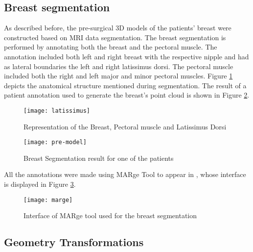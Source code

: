 \subsection{Breast segmentation}

As described before, the pre-surgical 3D models of the patients' breast were constructed based on MRI data segmentation. The breast segmentation is performed by annotating both the breast and the pectoral muscle. The annotation included both left and right breast with the respective nipple and had as lateral boundaries the left and right latissimus dorsi. The pectoral muscle included both the right and left major and minor pectoral muscles. Figure \ref{fig:latissimus} depicts the anatomical structure mentioned during segmentation. The result of a patient annotation used to generate the breast's point cloud is shown in Figure \ref{fig:pre_model_annotation}.

\begin{figure}[!htb]
\begin{center}
    \leavevmode
    \texttt{[image: latissimus]}
    \caption[Representation of the Breast, Pectoral muscle and Latissimus Dorsi]{Representation of the Breast, Pectoral muscle and Latissimus Dorsi}
    \label{fig:latissimus}
  \end{center}
\end{figure}

\begin{figure}[!htb]
\begin{center}
    \leavevmode
    \texttt{[image: pre-model]}
    \caption[Breast Segmentation result]{Breast Segmentation result for one of the patients}
    \label{fig:pre_model_annotation}
  \end{center}
\end{figure}

All the annotations were made using MARge Tool to appear in \cite{marge}, whose interface is displayed in Figure \ref{fig:marge}.

\begin{figure}[!h]
\begin{center}
    \leavevmode
    \texttt{[image: marge]}
    \caption[Interface of MARge tool used for the breast segmentation]{Interface of MARge tool used for the breast segmentation}
    \label{fig:marge}
  \end{center}
\end{figure}

\subsection{Geometry Transformations}\label{subsec:geometry_transf}

